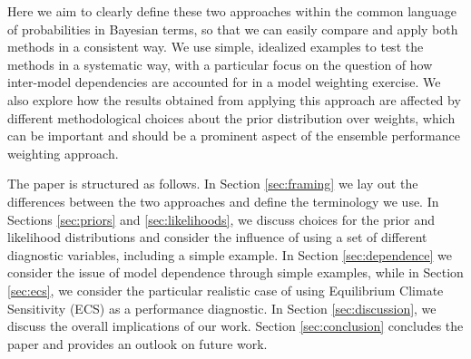 Here we aim to clearly define these two approaches within the common language of probabilities in Bayesian terms, so that we can easily compare and apply both methods in a consistent way. We use simple, idealized examples to test the methods in a systematic way, with a particular focus on the question of how inter-model dependencies are accounted for in a model weighting exercise.  We also  explore how  the results obtained from applying this approach are affected by different methodological choices about the prior distribution over weights, which can be important and should be a prominent aspect of the ensemble performance weighting approach. 

The paper is structured as follows. In Section \ref{sec:framing} we lay out the differences between the two approaches and define the terminology we use. In Sections \ref{sec:priors} and \ref{sec:likelihoods}, we discuss choices for the prior and likelihood distributions and consider the influence of using a set of different diagnostic variables, including a simple example. In Section \ref{sec:dependence} we consider the issue of model dependence through simple examples, while in Section \ref{sec:ecs}, we consider the particular realistic case of using Equilibrium Climate Sensitivity (ECS) as a performance diagnostic. In Section \ref{sec:discussion}, we discuss the overall implications of our work. Section \ref{sec:conclusion} concludes the paper and provides an outlook on future work.




